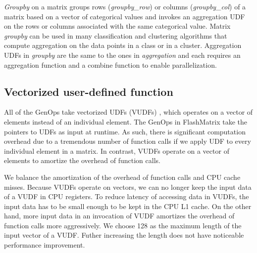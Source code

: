 \textit{Groupby} on a matrix groups rows (\textit{groupby\_row}) or columns
(\textit{groupby\_col}) of a matrix based on a vector of categorical values
and invokes an aggregation UDF on the rows or
columns associated with the same categorical value. Matrix \textit{groupby}
can be used in many classification and clustering algorithms that compute
aggregation on the data points in a class or in a cluster. Aggregation UDFs
in \textit{groupby} are the same
to the ones in \textit{aggregation} and each requires an aggregation function
and a combine function to enable parallelization.

\subsection{Vectorized user-defined function}
All of the GenOps take vectorized UDFs (VUDFs) ,
which operates on a vector of elements instead of an individual element.
The GenOps in FlashMatrix take the pointers to UDFs as input at runtime.
As such, there is significant computation overhead due to a tremendous number
of function calls if we apply UDF to every individual element in a matrix.
In contrast, VUDFs operate on a vector of elements to amortize the overhead
of function calls.

We balance the amortization of the overhead of function calls and CPU cache
misses. Because VUDFs operate on vectors, we can no longer keep the input data
of a VUDF in CPU registers. To reduce latency of accessing data in VUDFs,
the input data has to be small enough to be kept in the CPU L1 cache. On the
other hand, more input data in an invocation of VUDF amortizes the overhead of
function calls more aggressively. We choose 128 as the maximum length of
the input vector of a VUDF.
Futher increasing the length does not have noticeable performance improvement.

